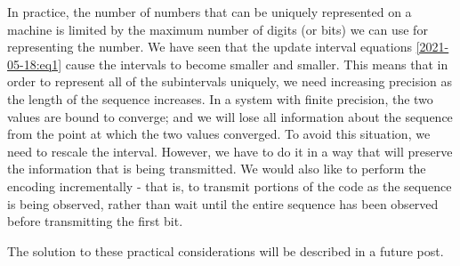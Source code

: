 In practice, the number of numbers that can be uniquely represented on a machine is limited by the maximum number of digits (or bits) we can use for representing the number. We have seen that the update interval equations \ref{2021-05-18:eq1} cause the intervals to become smaller and smaller. This means that in order to represent all of the subintervals uniquely, we need increasing precision as the length of the sequence increases. In a system with finite precision, the two values are bound to converge; and we will lose all information about the sequence from the point at which the two values converged. To avoid this situation, we need to rescale the interval. However, we have to do it in a way that will preserve the information that is being transmitted. We would also like to perform the encoding incrementally - that is, to transmit portions of the code as the sequence is being observed, rather than wait until the entire sequence has been observed before transmitting the first bit.

The solution to these practical considerations will be described in a future post.






